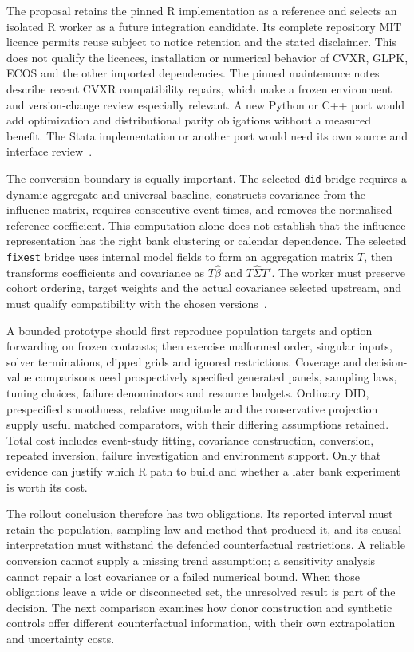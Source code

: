 The proposal retains the pinned R implementation as a reference and selects an
isolated R worker as a future integration candidate. Its complete repository
MIT licence permits reuse subject to notice retention and the stated disclaimer.
This does not qualify the licences, installation or numerical behavior of CVXR,
GLPK, ECOS and the other imported dependencies. The pinned maintenance notes
describe recent CVXR compatibility repairs, which make a frozen environment and
version-change review especially relevant. A new Python or C++ port would add
optimization and distributional parity obligations without a measured benefit.
The Stata implementation or another port would need its own source and interface
review~\citep{exec22_honestdid_engine}.

The conversion boundary is equally important. The selected \texttt{did} bridge
requires a dynamic aggregate and universal baseline, constructs covariance from
the influence matrix, requires consecutive event times, and removes the
normalised reference coefficient. This computation alone does not establish
that the influence representation has the right bank clustering or calendar
dependence. The selected \texttt{fixest} bridge uses internal model fields to
form an aggregation matrix $T$, then transforms coefficients and covariance as
$T\widehat\beta$ and $T\widehat\Sigma T'$. The worker must preserve cohort
ordering, target weights and the actual covariance selected upstream, and must
qualify compatibility with the chosen versions~\citep{exec22_honestdid_bridges}.

A bounded prototype should first reproduce population targets and option
forwarding on frozen contrasts; then exercise malformed order, singular inputs,
solver terminations, clipped grids and ignored restrictions. Coverage and
decision-value comparisons need prospectively specified generated panels,
sampling laws, tuning choices, failure denominators and resource budgets.
Ordinary DID, prespecified smoothness, relative magnitude and the conservative
projection supply useful matched comparators, with their differing assumptions
retained. Total cost includes event-study fitting, covariance construction,
conversion, repeated inversion, failure investigation and environment support.
Only that evidence can justify which R path to build and whether a later bank
experiment is worth its cost.

The rollout conclusion therefore has two obligations. Its reported interval
must retain the population, sampling law and method that produced it, and its
causal interpretation must withstand the defended counterfactual restrictions.
A reliable conversion cannot supply a missing trend assumption; a sensitivity
analysis cannot repair a lost covariance or a failed numerical bound. When
those obligations leave a wide or disconnected set, the unresolved result is
part of the decision. The next comparison examines how donor construction and
synthetic controls offer different counterfactual information, with their own
extrapolation and uncertainty costs.


